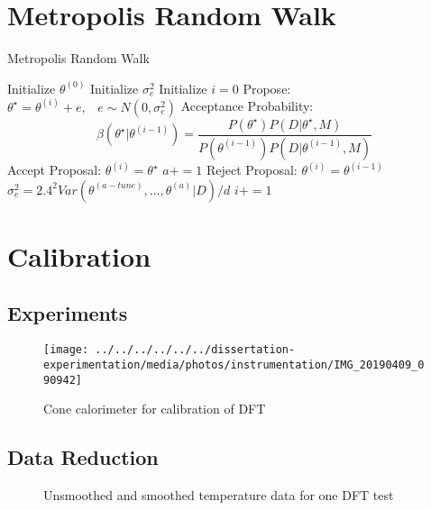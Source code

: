 \documentclass[article]{proc}
\begin{document}
\section{Metropolis Random Walk}

\begin{algorithm}
\caption{Metropolis Random Walk}\label{euclid}
\begin{algorithmic}[1]
\State Initialize $\theta^{(0)}$
\State Initialize $\sigma_e^2$
\State Initialize $i = 0$
    \State Propose: $\theta^{\star} = \theta^{(i)} + e, \hspace{10pt} e \sim N(0, \sigma_e^2)$
    \State Acceptance Probability: $$\beta (\theta^{\star} | \theta^{(i-1)}) = \frac{P(\theta^{\star})P(D|\theta^{\star},M)}{P(\theta^{(i-1)})P(D|\theta^{(i-1)}, M)}$$
            \State Accept Proposal: $\theta^{(i)} = \theta^{\star}$
            \State $a+=1$
        \Else
            \State Reject Proposal: $\theta^{(i)} = \theta^{(i-1)}$
        \EndIf
        \State $\sigma_e^2 = 2.4^2 Var(\theta^{(a-tune)}, \dots, \theta^{(a)}|D)/d$
    \EndWhile
    \State $i+=1$
\EndWhile
\end{algorithmic}
\end{algorithm}

\section{Calibration}

\subsection{Experiments}

\begin{figure}
    \centering
    \texttt{[image: ../../../../../../dissertation-experimentation/media/photos/instrumentation/IMG\_20190409\_090942]}
    \caption{Cone calorimeter for calibration of DFT}
    \label{fig:cone_dft}
\end{figure}

\subsection{Data Reduction}

\begin{figure}[b!]
    \centering
    \qquad
    \caption{Unsmoothed and smoothed temperature data for one DFT test}
    \label{fig:tc_data}
\end{figure}
\end{document}
